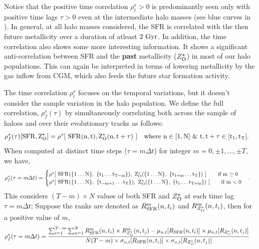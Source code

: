Notice that the positive time correlation $\rho^s_t>0$ is predominantly seen only with positive time lags $\tau>0$ even at the intermediate halo masses (see blue curves in ). In general, at all halo masses considered, the SFR is correlated with the then future metallicity over a duration of atleast $2~\rm{Gyr}$. In addition, the time correlation also shows some more interesting information. It shows a significant anti-correlation between SFR and the \textbf{past} metallicity ($Z^{\star}_{\rm{O}}$) in most of our halo populations. This can again be interpreted in terms of lowering metallicity by the gas inflow from CGM, which also feeds the future star formation activity. 

The time correlation $\rho^s_t$ focuses on the temporal variations, but it doesn't consider the sample variation in the halo population. We define the full correlation, $\rho^s_f(\tau)$ by simultaneously correlating both across the sample of haloes and over their evolutionary tracks as follows:
\begin{align}
\rho^s_f (\tau)[\rm{SFR}, Z^{\star}_{\rm{O}}] &= \rho^s [ ~\rm{SFR}(n,t), Z^{\star}_{\rm{O}}(n,t+\tau) ~] \quad \text{where } n \in [1,N] ~\&~ t, t+\tau \in [t_1,t_T].
\end{align}
When computed at distinct time steps ($\tau = m \Delta t$) for integer $m=0, \pm1, \ldots, \pm T$, we have,
\begin{align}
\label{eq:def-full-corr}
\rho^s_f (\tau = m \Delta t) &= 
\begin{cases}
\rho^s [ ~\rm{SFR}(\{1 \ldots N\}, ~\{t_1 \ldots t_{T-m}\}), ~Z^{\star}_{\rm{O}}(\{1 \ldots N\}, ~\{t_{1+m} \ldots t_T\}) ~]  \qquad \text{if } m \geq 0 \\
\rho^s [ ~\rm{SFR}(\{1 \ldots N\}, ~\{t_{-m+1} \ldots t_T\}), ~Z^{\star}_{\rm{O}}(\{1 \ldots N\}, ~\{t_1 \ldots t_{T+m}\}) ~] \qquad \text{if } m < 0
\end{cases}.
\end{align}
This considers $(T-m) \times N$ values of both SFR and $Z^{\star}_{\rm{O}}$ at each time lag $\tau = m \Delta t$; Suppose the ranks are denoted as $R^m_{\rm{SFR}}(n,t_i)$ and $R^m_{Z^{\star}_{\rm{O}}}(n,t_i)$, then for a positive value of $m$,
\begin{align}
\rho^s_f (\tau = m \Delta t) &= \frac{ \sum_{i=1}^{T-m} \sum_{n=1}^{N} R^m_{\rm{SFR}}(n,t_i) \times  R^m_{Z^{\star}_{\rm{O}}}(n,t_j) - \mu_{n,t} [ R_{\rm{SFR}}(n,t_i) ]  \times \mu_{n,t} [R_{Z^{\star}_{\rm{O}}}(n,t_j)] }
{ N(T-m) \times \sigma_{n,t} [ R_{\rm{SFR}}(n,t_i) ]  \times \sigma_{n,t} [R_{Z^{\star}_{\rm{O}}}(n,t_j)] }
\end{align}
